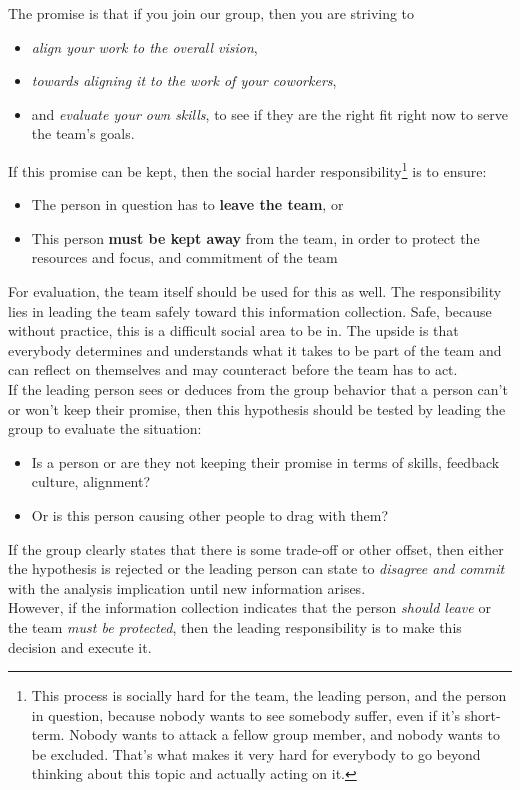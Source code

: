 The promise is that if you join our group, then you are striving to
\begin{itemize}
	\item \textit{align your work to the overall vision},
	\item \textit{towards aligning it to the work of your coworkers},
	\item  and \textit{evaluate your own skills}, to see if they are the right fit right now to serve the team's goals.
\end{itemize}


If this promise can be kept, then the social harder responsibility\footnote{
	This process is socially hard for the team, the leading person, and the person in question, because
	nobody wants to see somebody suffer, even if it's short-term. Nobody wants to attack a fellow group member, and nobody wants to be excluded. That's what makes it very hard for everybody to go beyond thinking about this topic and actually acting on it.
} is to ensure:
\begin{itemize}
	\item The person in question has to \textbf{leave the team}, or
	\item This person \textbf{must be kept away} from the team, in order to protect the resources and focus, and commitment of the team
\end{itemize}

For evaluation, the team itself should be used for this as well. The responsibility lies in leading the team safely toward this information collection. Safe, because without practice, this is a difficult social area to be in. The upside is that everybody determines and understands what it takes to be part of the team and can reflect on themselves and may counteract before the team has to act.\\

If the leading person sees or deduces from the group behavior that a person can't or won't keep their promise, then this hypothesis should be tested by leading the group to evaluate the situation:
\begin{itemize}
	\item Is a person or are they not keeping their promise in terms of skills, feedback culture, alignment?
	\item Or is this person causing other people to drag with them?
\end{itemize}
If the group clearly states that there is some trade-off or other offset, then either the hypothesis is rejected or the leading person can state to \textit{disagree and commit} with the analysis implication until new information arises.\\

However, if the information collection indicates that the person \textit{should leave} or the team \textit{must be protected}, then the leading responsibility is to make this decision and execute it.





